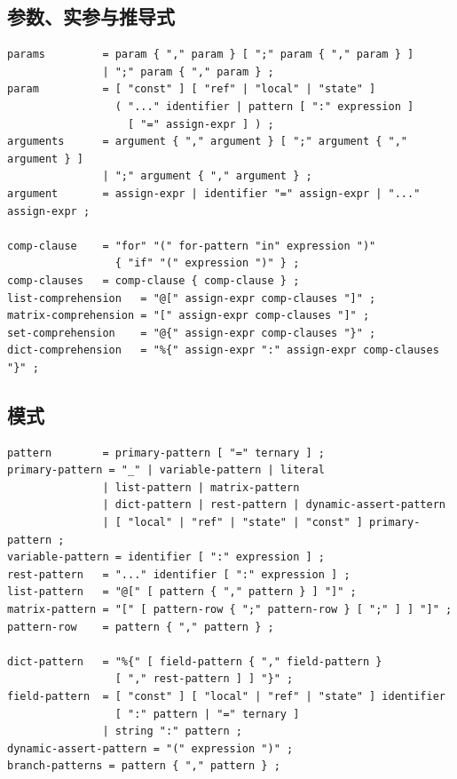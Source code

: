 \documentclass[UTF8,12pt]{ctexart}
\begin{document}
\subsection{参数、实参与推导式}

\begin{lstlisting}
params         = param { "," param } [ ";" param { "," param } ]
               | ";" param { "," param } ;
param          = [ "const" ] [ "ref" | "local" | "state" ]
                 ( "..." identifier | pattern [ ":" expression ]
                   [ "=" assign-expr ] ) ;
arguments      = argument { "," argument } [ ";" argument { "," argument } ]
               | ";" argument { "," argument } ;
argument       = assign-expr | identifier "=" assign-expr | "..." assign-expr ;

comp-clause    = "for" "(" for-pattern "in" expression ")"
                 { "if" "(" expression ")" } ;
comp-clauses   = comp-clause { comp-clause } ;
list-comprehension   = "@[" assign-expr comp-clauses "]" ;
matrix-comprehension = "[" assign-expr comp-clauses "]" ;
set-comprehension    = "@{" assign-expr comp-clauses "}" ;
dict-comprehension   = "%{" assign-expr ":" assign-expr comp-clauses "}" ;
\end{lstlisting}

\subsection{模式}

\begin{lstlisting}
pattern        = primary-pattern [ "=" ternary ] ;
primary-pattern = "_" | variable-pattern | literal
               | list-pattern | matrix-pattern
               | dict-pattern | rest-pattern | dynamic-assert-pattern
               | [ "local" | "ref" | "state" | "const" ] primary-pattern ;
variable-pattern = identifier [ ":" expression ] ;
rest-pattern   = "..." identifier [ ":" expression ] ;
list-pattern   = "@[" [ pattern { "," pattern } ] "]" ;
matrix-pattern = "[" [ pattern-row { ";" pattern-row } [ ";" ] ] "]" ;
pattern-row    = pattern { "," pattern } ;

dict-pattern   = "%{" [ field-pattern { "," field-pattern }
                 [ "," rest-pattern ] ] "}" ;
field-pattern  = [ "const" ] [ "local" | "ref" | "state" ] identifier
                 [ ":" pattern | "=" ternary ]
               | string ":" pattern ;
dynamic-assert-pattern = "(" expression ")" ;
branch-patterns = pattern { "," pattern } ;
\end{lstlisting}
\end{document}
